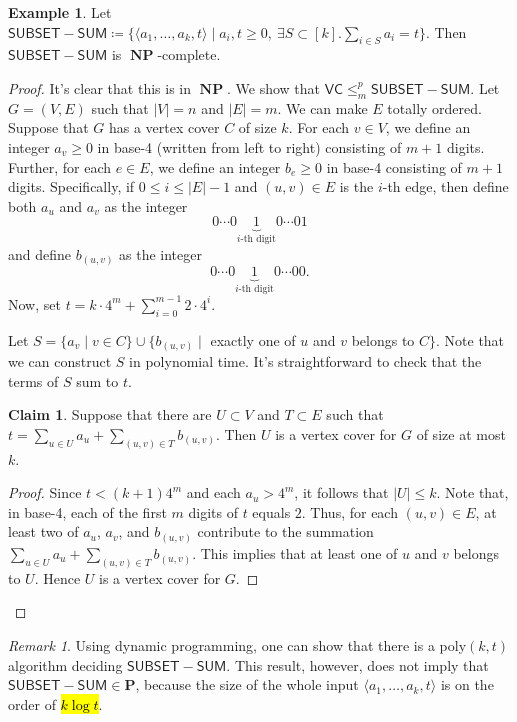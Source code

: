 \documentclass[10pt,letterpaper,cm]{nupset}
\theoremstyle{definition}
\newtheorem{exmp}[definition]{Example}
\theoremstyle{theorem}
\newtheorem*{claim}{Claim}
\theoremstyle{remark}
\newtheorem{remark}[definition]{Remark}
\newcommand{\1}{\mathbf{1}}
\newcommand{\0}{\vec 0}
\DeclareMathOperator{\NP}{\mathbf{NP}}
\begin{document}
\begin{exmp}
Let $\mathsf{SUBSET{-}SUM}\coloneqq \{\langle a_1, \ldots, a_k, t\rangle \mid a_i,t\geq 0,\ \exists S \subset [k].\sum_{i\in S} a_i = t\}$. Then $\mathsf{SUBSET{-}SUM}$ is $\NP$-complete.
\end{exmp}
\begin{proof}
It's clear that this is in $\NP$. We show that $\mathsf{VC} \leq_m^p \mathsf{SUBSET{-}SUM}$. Let $G=\left(V, E\right)$ such that $|V| = n$ and $|E|= m$. We can make $E$ totally ordered. Suppose that $G$ has a vertex cover $C$ of size $k$. For each $v\in V$, we define an integer $a_v\geq 0$ in base-4 (written from left to right) consisting of $m+1$ digits. Further, for each $e\in E$, we define an integer $b_e\geq 0$ in base-4 consisting of $m+1$ digits. Specifically, if $0\leq i \leq |E|-1$ and  $(u,v) \in E$ is the $i$-th edge, then define both $a_u$ and $a_v$  as the integer $$0 \cdots 0 \underbrace{1}_{i\text{-th digit}} 0 \cdots 01   $$ and define $b_{(u,v)}$ as the integer $$0 \cdots 0 \underbrace{1}_{i\text{-th digit}} 0 \cdots 00     .$$ Now, set $t= k \cdot 4^m + \sum_{i=0}^{m-1}2 \cdot 4^i$.

\medskip

 Let $S = \{a_v \mid v\in C\} \cup \{b_{(u,v)} \mid $ exactly one of $u$ and $v$ belongs to $C\}$. Note that we can construct $S$ in polynomial time. It's straightforward to check that the terms of $S$ sum to $t$. 
\begin{claim}
Suppose that there are $U\subset V$ and $T\subset E$ such that $t= \sum_{u\in U}a_u +\sum_{(u,v) \in T} b_{(u,v)}$. Then $U$ is a vertex cover for $G$ of size at most $k$.
\end{claim}
\begin{proof}
Since $t<(k+1)4^m$ and each $a_u> 4^m$, it follows that $|U|\leq k$. Note that, in base-4, each of the first $m$ digits of $t$ equals $2$. Thus, for each $(u,v) \in E$, at least two of $a_u$, $a_v$, and $b_{(u,v)}$ contribute to the summation $\sum_{u\in U}a_u +\sum_{(u,v) \in T} b_{(u,v)}$. This implies that at least one of $u$ and $v$ belongs to $U$. Hence $U$ is a vertex cover for $G$.
\end{proof}
\end{proof}

\begin{remark}
Using dynamic programming, one can show that there is a poly$(k, t)$ algorithm deciding $\mathsf{SUBSET{-}SUM}$. This result, however, does not imply that $\mathsf{SUBSET{-}SUM} \in \mathbf{P}$, because the size of the whole input $\langle a_1, \ldots, a_k, t\rangle$ is on the order of \hl{$k\log{t}$}.
\end{remark}
\end{document}
